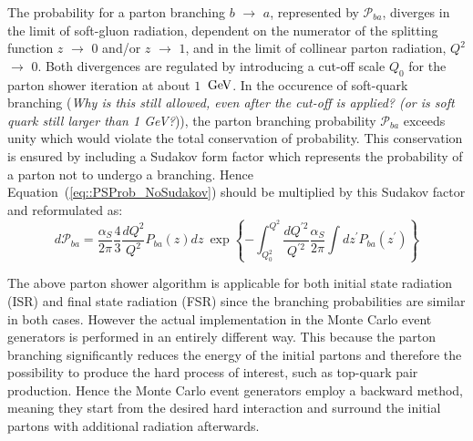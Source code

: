 The probability for a parton branching $b$ $\rightarrow$ $a$, represented by $\mathcal{P}_{ba}$, diverges in the limit of soft-gluon radiation, dependent on the numerator of the splitting function $z$ $\rightarrow$ $0$ and/or $z$ $\rightarrow$ $1$, and in the limit of collinear parton radiation, $Q^{2}$ $\rightarrow$ $0$.
Both divergences are regulated by introducing a cut-off scale $Q_{0}$ for the parton shower iteration at about $1$ $\, \mathrm{GeV}$. In the occurence of soft-quark branching (\textit{Why is this still allowed, even after the cut-off is applied? (or is soft quark still larger than 1 GeV?})), the parton branching probability $\mathcal{P}_{ba}$ exceeds unity which would violate the total conservation of probability. This conservation is ensured by including a Sudakov form factor which represents the probability of a parton not to undergo a branching. Hence Equation~(\ref{eq::PSProb_NoSudakov}) should be multiplied by this Sudakov factor and reformulated as:
\begin{equation}
 d\mathcal{P}_{ba} = \dfrac{\alpha_{S}}{2\pi} \dfrac{4}{3} \dfrac{dQ^{2}}{Q^{2}} P_{ba}(z)dz ~ \exp \left\lbrace - \int_{Q_{0}^{2}}^{Q^{2}} \dfrac{dQ^{'2}}{Q^{'2}} \dfrac{\alpha_{S}}{2\pi} \int dz^{'} P_{ba}(z^{'})  \right\rbrace
\end{equation}

The above parton shower algorithm is applicable for both initial state radiation (ISR) and final state radiation (FSR) since the branching probabilities are similar in both cases. However the actual implementation in the Monte Carlo event generators is performed in an entirely different way. This because the parton branching significantly reduces the energy of the initial partons and therefore the possibility to produce the hard process of interest, such as top-quark pair production. 
Hence the Monte Carlo event generators employ a backward method, meaning they start from the desired hard interaction and surround the initial partons with additional radiation afterwards.

